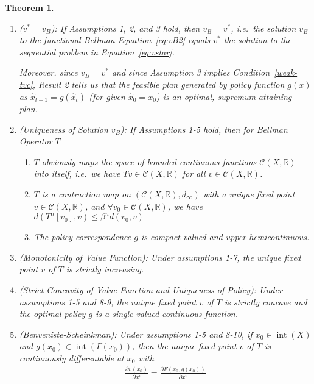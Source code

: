 \documentclass[12pt]{article}
\numberwithin{equation}{section} %
\theoremstyle{plain}
\newtheorem{thm}{Theorem}[section]
\theoremstyle{definition}
\theoremstyle{remark}
\newcommand{\sC}{\mathscr{C}}
\newcommand{\R}{\mathbb{R}}
\newcommand{\interior}{\operatorname{int}}
\begin{document}
\begin{thm}
\begin{enumerate}
  \item
    \emph{($v^*=v_B$)}:
    If Assumptions 1, 2, and 3 hold, then $v_B = v^*$, i.e.\
    the solution $v_B$ to the functional Bellman Equation~\ref{eq:vB2}
    equals $v^*$ the solution to the sequential problem in
    Equation~\ref{eq:vstar}.

    Moreover, since $v_B=v^*$ and since Assumption 3 implies
    Condition~\ref{weak-tvc}, Result 2 tells us that the feasible plan
    generated by policy function $g(x)$ as $\hat{x}_{t+1} =
    g(\hat{x}_t)$ (for given $\hat{x}_0=x_0$) is an optimal,
    supremum-attaining plan.

  \item
    \emph{(Uniqueness of Solution $v_B$)}:
    If Assumptions 1-5 hold, then for Bellman Operator $T$
    \begin{enumerate}
      \item $T$ obviously maps the space of bounded continuous functions
        $\sC(X,\R)$ into itself, i.e.\ we have
        $Tv \in \sC(X,\R)$ for all $v\in\sC(X,\R)$.
      \item
        $T$ is a contraction map on $(\sC(X,\R),d_\infty)$ with a unique
        fixed point $v \in\sC(X,\R)$, and
        $\forall v_0 \in \sC(X,\R)$, we have
        $d(T^n[v_0],v) \leq \beta^n d(v_0,v)$
      \item
        The policy correspondence $g$ is compact-valued and upper
        hemicontinuous.
    \end{enumerate}

  \item
    \emph{(Monotonicity of Value Function)}:
    Under assumptions 1-7, the unique fixed point $v$ of $T$ is strictly
    increasing.

  \item
    \emph{(Strict Concavity of Value Function and Uniqueness of Policy)}:
    Under assumptions 1-5 and 8-9, the unique fixed point $v$ of $T$ is
    strictly concave and the optimal policy $g$ is a single-valued
    continuous function.

  \item
    \emph{(Benveniste-Scheinkman)}:
    Under assumptions 1-5 and 8-10, if $x_0\in \interior(X)$ and
    $g(x_0)\in\interior(\Gamma(x_0))$, then the unique fixed point $v$
    of $T$ is continuously differentable at $x_0$ with
    \begin{align*}
      \frac{\partial v(x_0)}{\partial x^i}
      =
      \frac{\partial F(x_0, g(x_0))}{\partial x^i}
    \end{align*}
\end{enumerate}
\end{thm}
\end{document}
